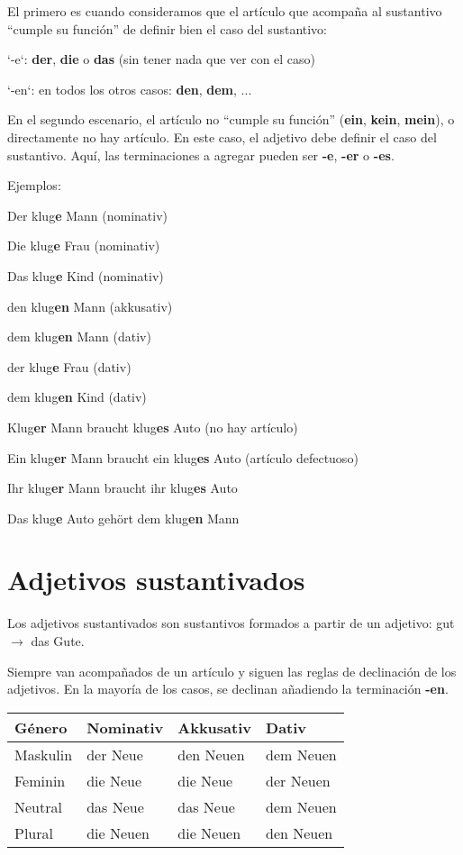 El primero es cuando consideramos que el artículo que acompaña al sustantivo ``cumple su función'' de definir bien el caso del sustantivo:
\begin{myitemize}
\item `-e`: \textbf{der}, \textbf{die} o \textbf{das} (sin tener nada que ver con el caso)
\item `-en`: en todos los otros casos: \textbf{den}, \textbf{dem}, ...
\end{myitemize}

En el segundo escenario, el artículo no ``cumple su función'' (\textbf{ein}, \textbf{kein}, \textbf{mein}), o directamente no hay artículo. En este caso, el adjetivo debe definir el caso del sustantivo. Aquí, las terminaciones a agregar pueden ser \textbf{-e}, \textbf{-er} o \textbf{-es}.

Ejemplos:
\begin{myitemize}
\item Der klug\textbf{e} Mann (nominativ)
\item Die klug\textbf{e} Frau (nominativ)
\item Das klug\textbf{e} Kind (nominativ)
\item den klug\textbf{en} Mann (akkusativ)
\item dem klug\textbf{en} Mann (dativ)
\item der klug\textbf{e} Frau (dativ)
\item dem klug\textbf{en} Kind (dativ)
\item Klug\textbf{er} Mann braucht klug\textbf{es} Auto (no hay artículo)
\item Ein klug\textbf{er} Mann braucht ein klug\textbf{es} Auto (artículo defectuoso)
\item Ihr klug\textbf{er} Mann braucht ihr klug\textbf{es} Auto
\item Das klug\textbf{e} Auto gehört dem klug\textbf{en} Mann
\end{myitemize}


\section{Adjetivos sustantivados}
Los adjetivos sustantivados son sustantivos formados a partir de un adjetivo: gut $\rightarrow$ das Gute.

Siempre van acompañados de un artículo y siguen las reglas de declinación de los adjetivos. En la mayoría de los casos, se declinan añadiendo la terminación \textbf{-en}.

\begin{tabular}{| l | l | l | l |}
\hline
\textbf{Género} & \textbf{Nominativ} & \textbf{Akkusativ} & \textbf{Dativ}\\
\hline
Maskulin & der Neue  & den Neuen & dem Neuen \\
Feminin  & die Neue  & die Neue  & der Neuen \\
Neutral  & das Neue  & das Neue  & dem Neuen \\
Plural   & die Neuen & die Neuen & den Neuen \\
\hline
\end{tabular}

